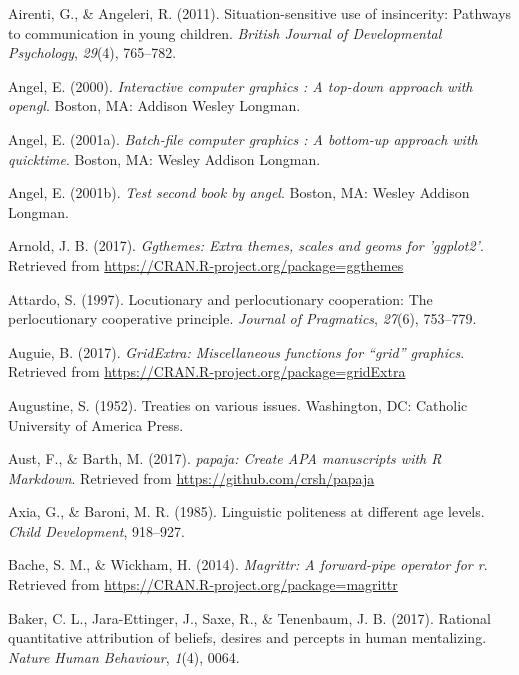 \documentclass[oneside]{report}
\begin{document}
\hypertarget{refs}{}
\hypertarget{ref-airenti2011}{}
Airenti, G., \& Angeleri, R. (2011). Situation-sensitive use of
insincerity: Pathways to communication in young children. \emph{British
Journal of Developmental Psychology}, \emph{29}(4), 765--782.

\hypertarget{ref-angel2000}{}
Angel, E. (2000). \emph{Interactive computer graphics : A top-down
approach with opengl}. Boston, MA: Addison Wesley Longman.

\hypertarget{ref-angel2001}{}
Angel, E. (2001a). \emph{Batch-file computer graphics : A bottom-up
approach with quicktime}. Boston, MA: Wesley Addison Longman.

\hypertarget{ref-angel2002a}{}
Angel, E. (2001b). \emph{Test second book by angel}. Boston, MA: Wesley
Addison Longman.

\hypertarget{ref-R-ggthemes}{}
Arnold, J. B. (2017). \emph{Ggthemes: Extra themes, scales and geoms for
'ggplot2'}. Retrieved from
\url{https://CRAN.R-project.org/package=ggthemes}

\hypertarget{ref-attardo1997}{}
Attardo, S. (1997). Locutionary and perlocutionary cooperation: The
perlocutionary cooperative principle. \emph{Journal of Pragmatics},
\emph{27}(6), 753--779.

\hypertarget{ref-R-gridExtra}{}
Auguie, B. (2017). \emph{GridExtra: Miscellaneous functions for ``grid''
graphics}. Retrieved from
\url{https://CRAN.R-project.org/package=gridExtra}

\hypertarget{ref-augustine1952}{}
Augustine, S. (1952). Treaties on various issues. Washington, DC:
Catholic University of America Press.

\hypertarget{ref-R-papaja}{}
Aust, F., \& Barth, M. (2017). \emph{papaja: Create APA manuscripts with
R Markdown}. Retrieved from \url{https://github.com/crsh/papaja}

\hypertarget{ref-axia1985}{}
Axia, G., \& Baroni, M. R. (1985). Linguistic politeness at different
age levels. \emph{Child Development}, 918--927.

\hypertarget{ref-R-magrittr}{}
Bache, S. M., \& Wickham, H. (2014). \emph{Magrittr: A forward-pipe
operator for r}. Retrieved from
\url{https://CRAN.R-project.org/package=magrittr}

\hypertarget{ref-baker2017rational}{}
Baker, C. L., Jara-Ettinger, J., Saxe, R., \& Tenenbaum, J. B. (2017).
Rational quantitative attribution of beliefs, desires and percepts in
human mentalizing. \emph{Nature Human Behaviour}, \emph{1}(4), 0064.
\end{document}
